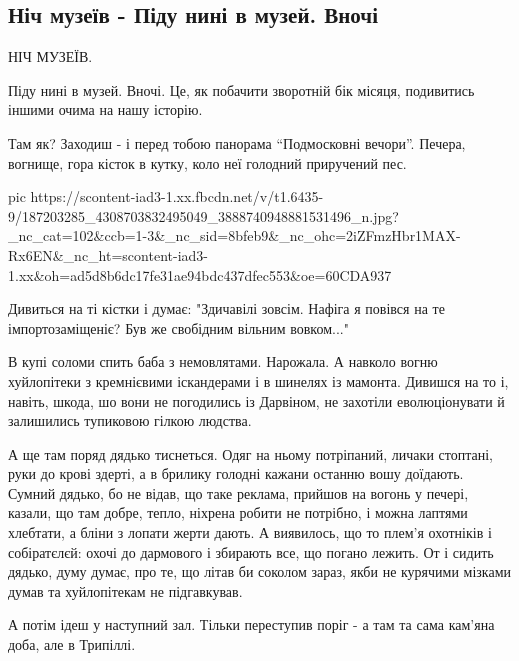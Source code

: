  
 
 
 
 
\subsection{Ніч музеїв - Піду нині в музей. Вночі}

НІЧ МУЗЕЇВ.

Піду нині в музей. Вночі. Це, як побачити зворотній бік місяця, подивитись
іншими очима на нашу історію. 

Там як? Заходиш - і перед тобою панорама \enquote{Подмосковні вечори}. Печера,
вогнище, гора кісток в кутку, коло неї голодний приручений пес. 

\ifcmt
  pic https://scontent-iad3-1.xx.fbcdn.net/v/t1.6435-9/187203285_4308703832495049_3888740948881531496_n.jpg?_nc_cat=102&ccb=1-3&_nc_sid=8bfeb9&_nc_ohc=2iZFmzHbr1MAX-Rx6EN&_nc_ht=scontent-iad3-1.xx&oh=ad5d8b6dc17fe31ae94bdc437dfec553&oe=60CDA937
\fi


Дивиться на ті кістки і думає: "Здичавілі зовсім. Нафіга я повівся на те імпортозаміщеніє? Був же свобідним вільним вовком..." 

В купі соломи спить баба з немовлятами. Нарожала.  А навколо вогню хуйлопітеки
з кремнієвими іскандерами і в шинелях із мамонта. Дивишся на то і, навіть,
шкода, шо вони не погодились із Дарвіном, не захотіли еволюціонувати й
залишились тупиковою гілкою людства.

А ще там поряд дядько тиснеться. Одяг на ньому потріпаний, личаки стоптані,
руки до крові здерті, а в брилику голодні кажани останню вошу доїдають. Сумний
дядько, бо не відав, що таке реклама, прийшов на вогонь у печері, казали, що
там добре, тепло, ніхрена робити не потрібно, і можна лаптями хлебтати, а бліни
з лопати жерти дають. А виявилось, що то плем'я охотніків і собіратєлєй: охочі
до дармового і збирають все, що погано лежить. От і сидить дядько, думу думає,
про те, що літав би соколом зараз, якби не курячими мізками думав та
хуйлопітекам не підгавкував. 

А потім ідеш у наступний зал. Тільки переступив поріг - а там та сама кам'яна доба, але в Трипіллі.

